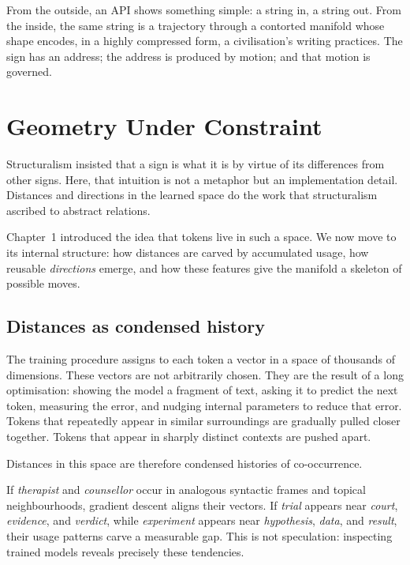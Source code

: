 From the outside, an API shows something simple: a string in, a string out. From the inside, the same string is a trajectory through a contorted manifold whose shape encodes, in a highly compressed form, a civilisation's writing practices. The sign has an address; the address is produced by motion; and that motion is governed.

\section{Geometry Under Constraint}

Structuralism insisted that a sign is what it is by virtue of its differences from other signs. Here, that intuition is not a metaphor but an implementation detail. Distances and directions in the learned space do the work that structuralism ascribed to abstract relations.

Chapter~1 introduced the idea that tokens live in such a space. We now move to its internal structure: how distances are carved by accumulated usage, how reusable \emph{directions} emerge, and how these features give the manifold a skeleton of possible moves.

\subsection*{Distances as condensed history}

The training procedure assigns to each token a vector in a space of thousands of dimensions. These vectors are not arbitrarily chosen. They are the result of a long optimisation: showing the model a fragment of text, asking it to predict the next token, measuring the error, and nudging internal parameters to reduce that error. Tokens that repeatedly appear in similar surroundings are gradually pulled closer together. Tokens that appear in sharply distinct contexts are pushed apart.

Distances in this space are therefore condensed histories of co-occurrence.

If \emph{therapist} and \emph{counsellor} occur in analogous syntactic frames and topical neighbourhoods, gradient descent aligns their vectors. If \emph{trial} appears near \emph{court}, \emph{evidence}, and \emph{verdict}, while \emph{experiment} appears near \emph{hypothesis}, \emph{data}, and \emph{result}, their usage patterns carve a measurable gap. This is not speculation: inspecting trained models reveals precisely these tendencies.

